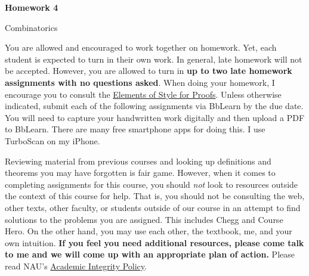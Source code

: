\documentclass[11pt]{article}%
\theoremstyle{definition}
\newcommand{\blankline}{\pagebreak[2]\vspace{.5\baselineskip}}
\begin{document}
\begin{center}
{\Large\bf Homework 4}

\smallskip

Combinatorics
\end{center}

\thispagestyle{fancy}

You are allowed and encouraged to work together on homework. Yet, each student is expected to turn in their own work. In general, late homework will not be accepted. However, you are allowed to turn in \textbf{up to two late homework assignments with no questions asked}. When doing your homework, I encourage you to consult the \href{http://danaernst.com/teaching/ElementsOfStyle.pdf}{Elements of Style for Proofs}. Unless otherwise indicated, submit each of the following assignments via BbLearn by the due date. You will need to capture your handwritten work digitally and then upload a PDF to BbLearn. There are many free smartphone apps for doing this. I use TurboScan on my iPhone.

\blankline

Reviewing material from previous courses and looking up definitions and theorems you may have forgotten is fair game. However, when it comes to completing assignments for this course, you should \textit{not} look to resources outside the context of this course for help.  That is, you should not be consulting the web, other texts, other faculty, or students outside of our course in an attempt to find solutions to the problems you are assigned.  This includes Chegg and Course Hero. On the other hand, you may use each other, the textbook, me, and your own intuition. \textbf{If you feel you need additional resources, please come talk to me and we will come up with an appropriate plan of action.} Please read NAU's \href{https://www5.nau.edu/policies/Client/Details/828?whoIsLooking=Students&pertainsTo=All&sortDirection=Ascending&page=1}{Academic Integrity Policy}.

\blankline
\end{document}
